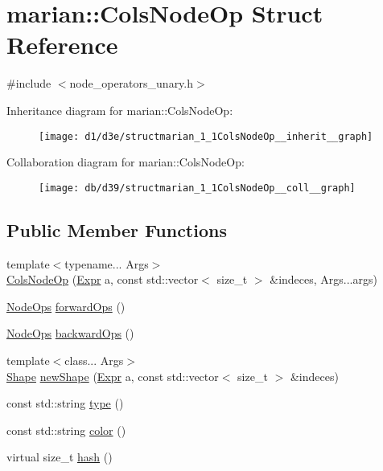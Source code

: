 \hypertarget{structmarian_1_1ColsNodeOp}{}\section{marian\+:\+:Cols\+Node\+Op Struct Reference}
\label{structmarian_1_1ColsNodeOp}


{\ttfamily \#include $<$node\+\_\+operators\+\_\+unary.\+h$>$}



Inheritance diagram for marian\+:\+:Cols\+Node\+Op\+:
\nopagebreak
\begin{figure}[H]
\begin{center}
\leavevmode
\texttt{[image: d1/d3e/structmarian\_1\_1ColsNodeOp\_\_inherit\_\_graph]}
\end{center}
\end{figure}


Collaboration diagram for marian\+:\+:Cols\+Node\+Op\+:
\nopagebreak
\begin{figure}[H]
\begin{center}
\leavevmode
\texttt{[image: db/d39/structmarian\_1\_1ColsNodeOp\_\_coll\_\_graph]}
\end{center}
\end{figure}
\subsection*{Public Member Functions}
\begin{DoxyCompactItemize}
\item 
{\footnotesize template$<$typename... Args$>$ }\\\hyperlink{structmarian_1_1ColsNodeOp_ac2903df4ca1bab6bd607f72b7261bb27}{Cols\+Node\+Op} (\hyperlink{namespacemarian_a498d8baf75b754011078b890b39c8e12}{Expr} a, const std\+::vector$<$ size\+\_\+t $>$ \&indeces, Args...\+args)
\item 
\hyperlink{namespacemarian_a4956376218cc236016c20bc4071470da}{Node\+Ops} \hyperlink{structmarian_1_1ColsNodeOp_aa896f8391cb93021b9bd375dc5e2764f}{forward\+Ops} ()
\item 
\hyperlink{namespacemarian_a4956376218cc236016c20bc4071470da}{Node\+Ops} \hyperlink{structmarian_1_1ColsNodeOp_ab5711eb131212a41924e7da36d2e396c}{backward\+Ops} ()
\item 
{\footnotesize template$<$class... Args$>$ }\\\hyperlink{structmarian_1_1Shape}{Shape} \hyperlink{structmarian_1_1ColsNodeOp_a22553cfaa20952f20581670d433bad5b}{new\+Shape} (\hyperlink{namespacemarian_a498d8baf75b754011078b890b39c8e12}{Expr} a, const std\+::vector$<$ size\+\_\+t $>$ \&indeces)
\item 
const std\+::string \hyperlink{structmarian_1_1ColsNodeOp_a80be0674db468899b33ab96ee859d4f6}{type} ()
\item 
const std\+::string \hyperlink{structmarian_1_1ColsNodeOp_a7a05f997b241c0f524c125e111096218}{color} ()
\item 
virtual size\+\_\+t \hyperlink{structmarian_1_1ColsNodeOp_a4ca2bfb0920d3b4e3d2439445c1bc75d}{hash} ()
\end{DoxyCompactItemize}
